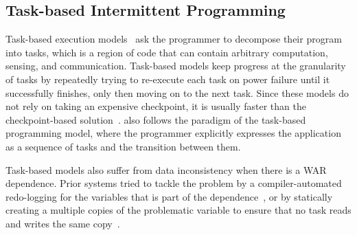 \subsection{Task-based Intermittent Programming}
\label{section:background_task_computing}

Task-based execution models~\cite{dino,chain,alpaca} ask the programmer to decompose their program into tasks,
which is a region of code that can contain arbitrary computation, sensing, and communication. 
Task-based models keep progress at the granularity of tasks by repeatedly trying to re-execute
each task on power failure until it successfully finishes, only then moving on to the next task.
Since these models do not rely on taking an expensive checkpoint, it is usually faster than the
checkpoint-based solution~\cite{chain, alpaca}.
\sys also follows the paradigm of the task-based programming model, where the programmer
explicitly expresses the application as a sequence of tasks and the transition between them.

Task-based models also suffer from data inconsistency when there is a WAR dependence.
Prior systems tried to tackle the problem by a compiler-automated redo-logging for the variables
that is part of the dependence~\cite{alpaca}, or by statically creating a multiple copies of the problematic variable
to ensure that no task reads and writes the same copy~\cite{chain}.

